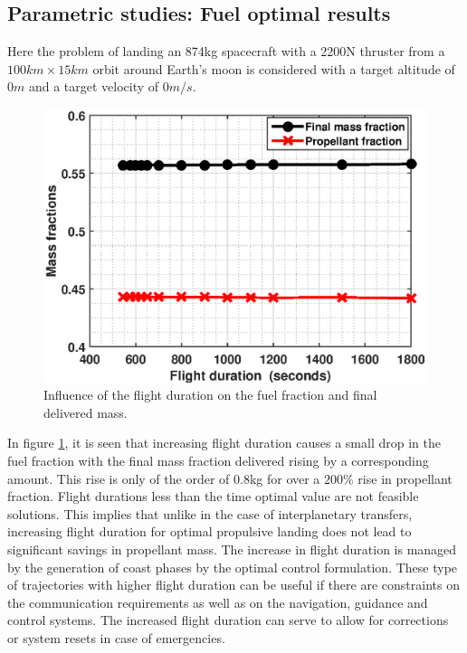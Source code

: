 \subsection{Parametric studies: Fuel optimal results}
Here the problem of landing an 874kg spacecraft with a 2200N thruster from a $100km\times 15km$ orbit around Earth's moon is considered with a target altitude of $0m$ and a target velocity of $0m/s$.
\begin{figure}[H]
	\centering\includegraphics[width=0.90\linewidth]{FuelOpt_massfracs.eps}
	\caption{Influence of the flight duration on the fuel fraction and final delivered mass.}
	\label{fig:parametric:4}
\end{figure}
In figure \ref{fig:parametric:4}, it is seen that increasing flight duration causes a small drop in the fuel fraction with the final mass fraction delivered rising by a corresponding amount. This rise is only of the order of 0.8kg for over a $200\%$ rise in propellant fraction. Flight durations less than the time optimal value are not feasible solutions. This implies that unlike in the case of interplanetary transfers, increasing flight duration for  optimal propulsive landing does not lead to significant savings in propellant mass. The increase in flight duration is managed by the generation of coast phases by the optimal control formulation. These type of trajectories with higher flight duration can be useful if there are constraints on the communication requirements as well as on the navigation, guidance and control systems. The increased flight duration can serve to allow for corrections or system resets in case of emergencies.
